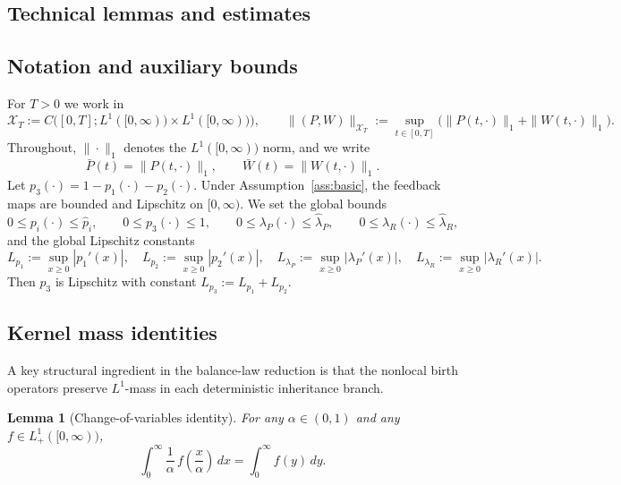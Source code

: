 \documentclass[pdflatex,sn-mathphys-ay]{sn-jnl}
\theoremstyle{thmstyleone}
\newtheorem{lemma}[theorem]{Lemma}
\theoremstyle{definition}
\theoremstyle{remark}
\begin{document}
\begin{appendices}

\section{Technical lemmas and estimates}

\subsection{Notation and auxiliary bounds}
\label{app:notation_bounds}
For $T>0$ we work in
\[
\mathcal X_T:=C\!\big([0,T];L^1([0,\infty))\times L^1([0,\infty))\big),\qquad
\|(P,W)\|_{\mathcal X_T}:=\sup_{t\in[0,T]}\big(\|P(t,\cdot)\|_1+\|W(t,\cdot)\|_1\big).
\]
Throughout, $\|\cdot\|_1$ denotes the $L^1([0,\infty))$ norm, and we write
\[
\bar P(t)=\|P(t,\cdot)\|_1,\qquad \bar W(t)=\|W(t,\cdot)\|_1.
\]
Let $p_3(\cdot)=1-p_1(\cdot)-p_2(\cdot)$. Under Assumption~\ref{ass:basic}, the feedback maps are
bounded and Lipschitz on $[0,\infty)$. We set the global bounds
\begin{equation}\label{app:eq:bounds}
0\le p_i(\cdot)\le \hat p_i,\qquad 0\le p_3(\cdot)\le 1,\qquad
0\le \lambda_P(\cdot)\le \hat\lambda_P,\qquad 0\le \lambda_R(\cdot)\le \hat\lambda_R,
\end{equation}
and the global Lipschitz constants
\begin{equation}\label{app:eq:Lipschitz_constants}
L_{p_1}:=\sup_{x\ge 0}|p_1'(x)|,\quad
L_{p_2}:=\sup_{x\ge 0}|p_2'(x)|,\quad
L_{\lambda_P}:=\sup_{x\ge 0}|\lambda_P'(x)|,\quad
L_{\lambda_R}:=\sup_{x\ge 0}|\lambda_R'(x)|.
\end{equation}
Then $p_3$ is Lipschitz with constant $L_{p_3}:=L_{p_1}+L_{p_2}$.

\subsection{Kernel mass identities}
\label{app:kernel_mass}
A key structural ingredient in the balance-law reduction is that the nonlocal birth operators
preserve $L^1$-mass in each deterministic inheritance branch.

\begin{lemma}[Change-of-variables identity]\label{lem:cov_identity}
For any $\alpha\in(0,1)$ and any $f\in L^1_+([0,\infty))$,
\begin{equation}\label{app:eq:cov}
\int_0^\infty \frac{1}{\alpha}\, f\!\left(\frac{x}{\alpha}\right)\,dx
=\int_0^\infty f(y)\,dy.
\end{equation}
\end{lemma}


\end{appendices}
\end{document}
